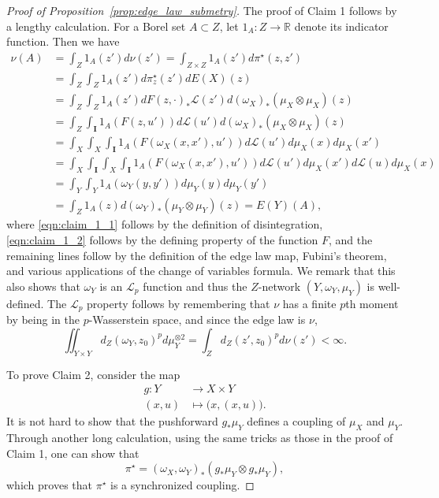 \documentclass{article}
\theoremstyle{definition}
\newcommand{\R}{\mathbb{R}}
\newcommand{\Lp}{\mathcal{L}_p}
\begin{document}
\begin{proof}[Proof of Proposition~\ref{prop:edge_law_submetry}]
    The proof of Claim 1 follows by a lengthy calculation. For a Borel set $A \subset Z$, let $1_A:Z \to \R$ denote its indicator function. Then we have
    \begin{align}
        \nu(A) &= \int_Z 1_A(z') d\nu(z') = \int_{Z\times Z} 1_A(z') d\pi^\star (z,z') \\
        &= \int_Z \int_Z 1_A(z') d\pi^\star_z(z') dE(X)(z) \label{eqn:claim_1_1}\\
        &= \int_Z \int_Z 1_A(z') dF(z,\cdot)_\ast \mathscr{L}(z') d(\omega_X)_\ast(\mu_X \otimes \mu_X)(z) \label{eqn:claim_1_2}\\
        &= \int_Z \int_\mathbf{I} 1_A(F(z,u')) d\mathscr{L}(u') d(\omega_X)_\ast (\mu_X \otimes \mu_X)(z) \\
        &= \int_X \int_X \int_\mathbf{I} 1_A(F(\omega_X(x,x'),u')) d\mathscr{L}(u') d\mu_X(x) d\mu_X(x') \\
        &= \int_X \int_\mathbf{I} \int_X \int_{\mathbf{I}} 1_A(F(\omega_X(x,x'),u')) d\mathscr{L}(u') d\mu_X(x') d\mathscr{L}(u) d\mu_X(x)   \\
        &= \int_Y \int_Y 1_A(\omega_Y(y,y')) d\mu_Y(y) d\mu_Y(y') \\
        &= \int_Z 1_A(z) d(\omega_Y)_\ast(\mu_Y \otimes \mu_Y)(z) = E(Y)(A),
    \end{align}
    where \eqref{eqn:claim_1_1} follows by the definition of disintegration, \eqref{eqn:claim_1_2} follows by the defining property of the function $F$, and the remaining lines follow by the definition of the edge law map, Fubini's theorem, and various applications of the change of variables formula.  We remark that this also shows that $\omega_Y$ is an $\Lp$ function and thus the $Z$-network $(Y,\omega_Y,\mu_Y)$ is well-defined. The $\mathcal{L}_p$ property follows by remembering that $\nu$ has a finite $p$th moment by being in the $p$-Wasserstein space, and since the edge law is $\nu$,
    \begin{equation}
        \iint_{Y \times Y} d_Z(\omega_Y,z_0)^pd\mu_Y^{\otimes 2} = \int_{Z}d_Z(z',z_0)^pd\nu(z')<\infty.
    \end{equation}
    

    To prove Claim 2, consider the map 
    \begin{align*}
        g:Y &\to X \times Y \\
        (x,u) &\mapsto \big(x,(x,u)\big).
    \end{align*}
    It is not hard to show that the pushforward $g_\ast \mu_Y$ defines a coupling of $\mu_X$ and $\mu_Y$. Through another long calculation, using the same tricks as those in the proof of Claim 1, one can show that 
    \[
    \pi^\star = (\omega_X,\omega_Y)_\ast (g_\ast \mu_Y \otimes g_\ast \mu_Y),
    \]
    which proves that $\pi^\star$ is a synchronized coupling. 

%
%
%
%
%

%
%
%
%
%
%
%
%
%
%
%
%
%
%
%
%
%
%
%
%
%
%
%
%
%
%
%
%
%
%
%
%
%
%
%
%
%
%
%
%
%
%
%
\end{proof}
\end{document}
